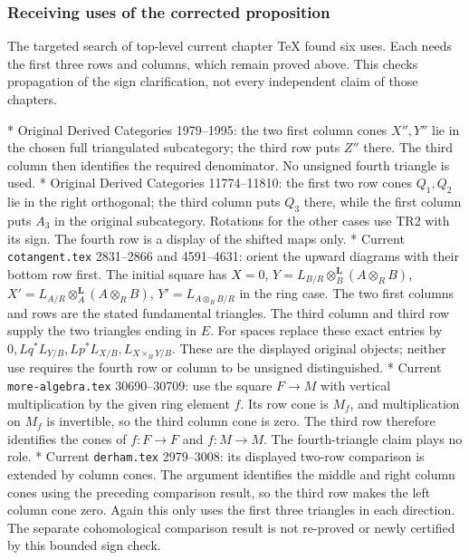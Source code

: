 \documentclass[11pt]{article}
\begin{document}
\subsubsection{Receiving uses of the corrected proposition}\label{proofs-0001-1140-receiving-uses-of-the-corrected-proposition}

The targeted search of top-level current chapter TeX found six uses. Each needs the first three rows and columns,\allowbreak{} which remain proved above. This checks propagation of the sign clarification,\allowbreak{} not every independent claim of those chapters.

* Original Derived Categories 1979–\allowbreak{}1995:\allowbreak{} the two first column cones \(X'',Y''\) lie in the chosen full triangulated subcategory; the third row puts \(Z''\) there. The third column then identifies the required denominator. No unsigned fourth triangle is used. * Original Derived Categories 11774–\allowbreak{}11810:\allowbreak{} the first two row cones \(Q_1,Q_2\) lie in the right orthogonal; the third column puts \(Q_3\) there,\allowbreak{} while the first column puts \(A_3\) in the original subcategory. Rotations for the other cases use TR2 with its sign. The fourth row is a display of the shifted maps only. * Current \texttt{cotangent.\allowbreak{}tex} 2831–\allowbreak{}2866 and 4591–\allowbreak{}4631:\allowbreak{} orient the upward diagrams with their bottom row first. The initial square has \(X=0\),\allowbreak{} \(Y=L_{B/R}\otimes_B^{\mathbf L}(A\otimes_RB)\),\allowbreak{} \(X'=L_{A/R}\otimes_A^{\mathbf L}(A\otimes_RB)\),\allowbreak{} \(Y'=L_{A\otimes_RB/R}\) in the ring case. The two first columns and rows are the stated fundamental triangles. The third column and third row supply the two triangles ending in \(E\). For spaces replace these exact entries by \(0,Lq^*L_{Y/B},Lp^*L_{X/B},
L_{X\times_BY/B}\). These are the displayed original objects; neither use requires the fourth row or column to be unsigned distinguished. * Current \texttt{more-\allowbreak{}algebra.\allowbreak{}tex} 30690–\allowbreak{}30709:\allowbreak{} use the square \(F\to M\) with vertical multiplication by the given ring element \(f\). Its row cone is \(M_f\),\allowbreak{} and multiplication on \(M_f\) is invertible,\allowbreak{} so the third column cone is zero. The third row therefore identifies the cones of \(f:F\to F\) and \(f:M\to M\). The fourth-triangle claim plays no role. * Current \texttt{derham.\allowbreak{}tex} 2979–\allowbreak{}3008:\allowbreak{} its displayed two-row comparison is extended by column cones. The argument identifies the middle and right column cones using the preceding comparison result,\allowbreak{} so the third row makes the left column cone zero. Again this only uses the first three triangles in each direction. The separate cohomological comparison result is not re-proved or newly certified by this bounded sign check.
\end{document}
